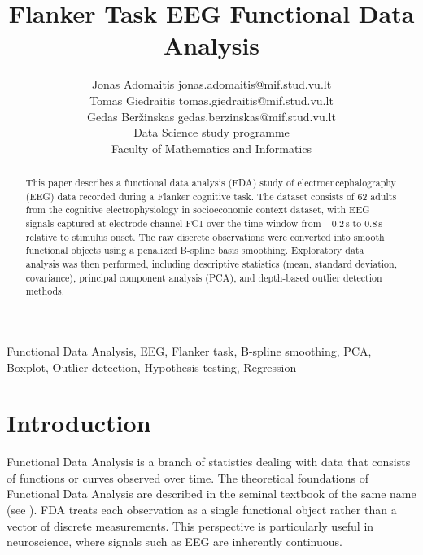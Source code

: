 \documentclass[twoside,11pt]{article}
\begin{document}
\setlength{\parindent}{15pt}

\title{Flanker Task EEG Functional Data Analysis}

\author{\name Jonas Adomaitis \email jonas.adomaitis@mif.stud.vu.lt \\
  \name Tomas Giedraitis \email tomas.giedraitis@mif.stud.vu.lt \\
  \name Gedas Ber\v{z}inskas \email gedas.berzinskas@mif.stud.vu.lt \\
  \addr Data Science study programme \\
  Faculty of Mathematics and Informatics}


\maketitle

\begin{abstract}%
This paper describes a functional data analysis (FDA) study of electroencephalography (EEG) data
recorded during a Flanker cognitive task. The dataset consists of 62 adults from the cognitive
electrophysiology in socioeconomic context dataset, with EEG signals captured at electrode channel
FC1 over the time window from $-0.2\,\mathrm{s}$ to $0.8\,\mathrm{s}$ relative to stimulus onset.
The raw discrete observations were converted into smooth functional objects using a penalized
B-spline basis smoothing. Exploratory data analysis was then performed, including descriptive
statistics (mean, standard deviation, covariance), principal component analysis (PCA), and
depth-based outlier detection methods.
\end{abstract}

\begin{keywords}
Functional Data Analysis, EEG, Flanker task, B-spline smoothing, PCA, Boxplot, Outlier detection,
Hypothesis testing, Regression
\end{keywords}

\section{Introduction}

Functional Data Analysis is a branch of statistics dealing with data that consists of functions or
curves observed over time. The theoretical foundations of Functional Data Analysis are described in
the seminal textbook of the same name (see \cite{ramsay2006functional}). FDA treats each observation
as a single functional object rather than a vector of discrete measurements. This perspective is
particularly useful in neuroscience, where signals such as EEG are inherently continuous.
\end{document}
